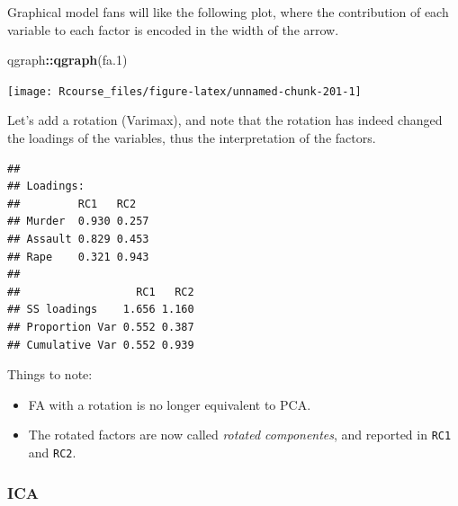 \documentclass[]{book}
\newenvironment{Shaded}{\begin{snugshade}}{\end{snugshade}}
\newcommand{\KeywordTok}[1]{\textcolor[rgb]{0.13,0.29,0.53}{\textbf{#1}}}
\newcommand{\DataTypeTok}[1]{\textcolor[rgb]{0.13,0.29,0.53}{#1}}
\newcommand{\DecValTok}[1]{\textcolor[rgb]{0.00,0.00,0.81}{#1}}
\newcommand{\StringTok}[1]{\textcolor[rgb]{0.31,0.60,0.02}{#1}}
\newcommand{\OperatorTok}[1]{\textcolor[rgb]{0.81,0.36,0.00}{\textbf{#1}}}
\newcommand{\NormalTok}[1]{#1}
\providecommand{\tightlist}{%
  \setlength{\itemsep}{0pt}\setlength{\parskip}{0pt}}
\theoremstyle{definition}
\theoremstyle{definition}
\theoremstyle{definition}
\theoremstyle{remark}
\begin{document}
Graphical model fans will like the following plot, where the
contribution of each variable to each factor is encoded in the width of
the arrow.

\begin{Shaded}
\begin{Highlighting}[]
\NormalTok{qgraph}\OperatorTok{::}\KeywordTok{qgraph}\NormalTok{(fa.}\DecValTok{1}\NormalTok{)}
\end{Highlighting}
\end{Shaded}

\texttt{[image: Rcourse\_files/figure-latex/unnamed-chunk-201-1]}

Let's add a rotation (Varimax), and note that the rotation has indeed
changed the loadings of the variables, thus the interpretation of the
factors.

\begin{Shaded}
\end{Shaded}

\begin{verbatim}
## 
## Loadings:
##         RC1   RC2  
## Murder  0.930 0.257
## Assault 0.829 0.453
## Rape    0.321 0.943
## 
##                  RC1   RC2
## SS loadings    1.656 1.160
## Proportion Var 0.552 0.387
## Cumulative Var 0.552 0.939
\end{verbatim}

Things to note:

\begin{itemize}
\tightlist
\item
  FA with a rotation is no longer equivalent to PCA.
\item
  The rotated factors are now called \emph{rotated componentes}, and
  reported in \texttt{RC1} and \texttt{RC2}.
\end{itemize}

\subsubsection{ICA}\label{ica}
\end{document}
